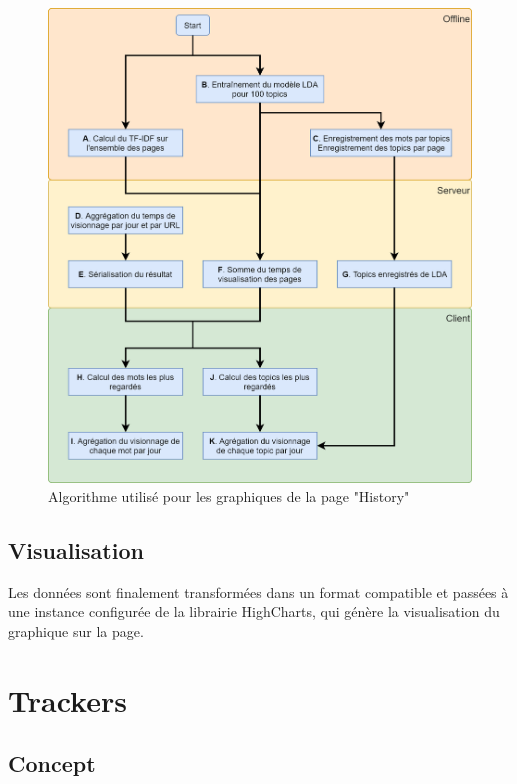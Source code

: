 		\begin{figure}[!h]
			\centering
			\includegraphics[height=1.15\textwidth]{images/design/pages/history_algo}
			\caption{Algorithme utilisé pour les graphiques de la page "History"}
			\label{history_algo}
		\end{figure}

	\subsection{Visualisation}

		Les données sont finalement transformées dans un format compatible et passées à une instance configurée de la librairie HighCharts, qui génère la visualisation du graphique sur la page.

\clearpage

%
%
%
%

\section{Trackers}

	\subsection{Concept}

